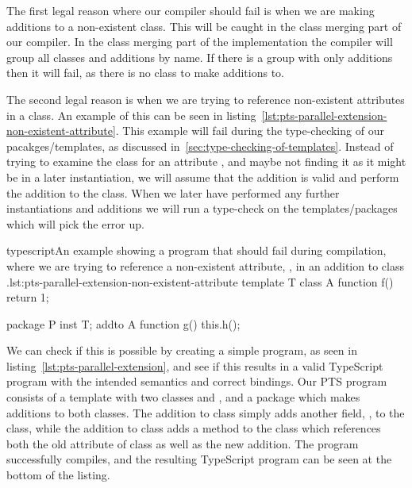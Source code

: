 The first legal reason where our compiler should fail is when we are making additions to a non-existent class.
This will be caught in the class merging part of our compiler.
In the class merging part of the implementation the compiler will group all classes and additions by name.
If there is a group with only additions then it will fail, as there is no class to make additions to.

The second legal reason is when we are trying to reference non-existent attributes in a class.
An example of this can be seen in listing~\vref{lst:pts-parallel-extension-non-existent-attribute}.
This example will fail during the type-checking of our pacakges/templates, as discussed in~\vref{sec:type-checking-of-templates}.
Instead of trying to examine the class  for an attribute , and maybe not finding it as it might be in a later instantiation, we will assume that the addition is valid and perform the addition to the class.
When we later have performed any further instantiations and additions we will run a type-check on the templates/packages which will pick the error up.

\begin{code}{typescript}{An example showing a program that should fail during compilation, where we are trying to reference a non-existent attribute, , in an addition to class .}{lst:pts-parallel-extension-non-existent-attribute}
    template T {
        class A {
            function f() {
                return 1;
            }
        }
    }

    package P {
        inst T;
        addto A {
            function g() {
                this.h();
            }
        }
    }
\end{code}


We can check if this is possible by creating a simple program, as seen in listing~\vref{lst:pts-parallel-extension}, and see if this results in a valid TypeScript program with the intended semantics and correct bindings.
Our PTS program consists of a template  with two classes  and , and a package  which makes additions to both classes.
The addition to class  simply adds another field, , to the class, while the addition to class  adds a method to the class which references both the old attribute of class  as well as the new addition.
The program successfully compiles, and the resulting TypeScript program can be seen at the bottom of the listing.


